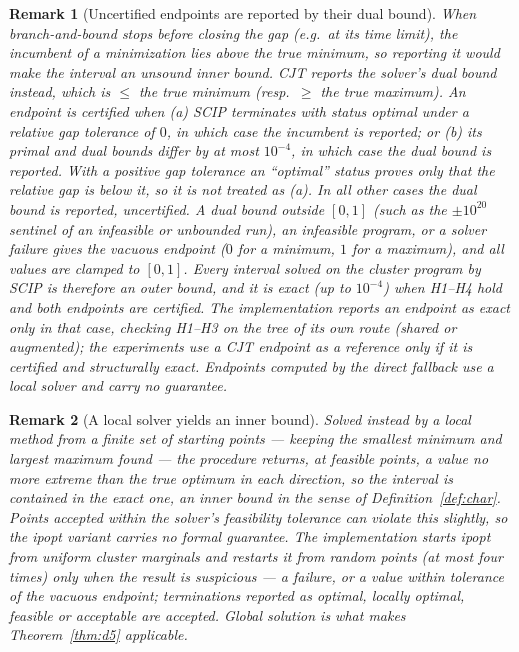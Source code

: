 \documentclass{article} %
\newtheorem{remark}{Remark}
\begin{document}
\begin{remark}[Uncertified endpoints are reported by their dual bound]\label{rem:dual}
When branch-and-bound stops before closing the gap (e.g.\ at its time limit),
the incumbent of a minimization lies \emph{above} the true minimum, so reporting
it would make the interval an unsound inner bound. \textsc{CJT} reports the
solver's \emph{dual} bound instead, which is $\le$ the true minimum (resp.\ $\ge$
the true maximum). An endpoint is \emph{certified} when (a) SCIP terminates with
status optimal under a relative gap tolerance of $0$, in which case the incumbent
is reported; or (b) its primal and dual bounds differ by at most $10^{-4}$, in
which case the dual bound is reported. With a positive gap tolerance an
``optimal'' status proves only that the relative gap is below it, so it is not
treated as (a). In all other cases the dual bound is reported, uncertified. A
dual bound outside $[0,1]$ (such as the $\pm10^{20}$ sentinel of an infeasible or
unbounded run), an infeasible program, or a solver failure gives the vacuous
endpoint ($0$ for a minimum, $1$ for a maximum), and all values are clamped to
$[0,1]$. Every interval solved on the cluster program by SCIP is therefore an
outer bound, and it is exact (up to $10^{-4}$) when H1--H4 hold and both endpoints
are certified. The implementation reports an endpoint as exact only in that case,
checking H1--H3 on the tree of its own route (shared or augmented); the
experiments use a \textsc{CJT} endpoint as a reference only if it is certified and
structurally exact. Endpoints computed by the direct fallback use a local solver
and carry no guarantee.
\end{remark}

\begin{remark}[A local solver yields an inner bound]\label{rem:ipoptinner}
Solved instead by a local method from a finite set of starting points --- keeping
the smallest minimum and largest maximum found --- the procedure returns, at
feasible points, a value no more extreme than the true optimum in each direction,
so the interval is contained in the exact one, an \emph{inner} bound in the sense
of Definition~\ref{def:char}. Points accepted within the solver's feasibility
tolerance can violate this slightly, so the ipopt variant carries no formal
guarantee. The implementation starts ipopt from uniform cluster marginals and
restarts it from random points (at most four times) only when the result is
suspicious --- a failure, or a value within tolerance of the vacuous endpoint;
terminations reported as optimal, locally optimal, feasible or acceptable are
accepted. Global solution is what makes Theorem~\ref{thm:d5} applicable.
\end{remark}
\end{document}
